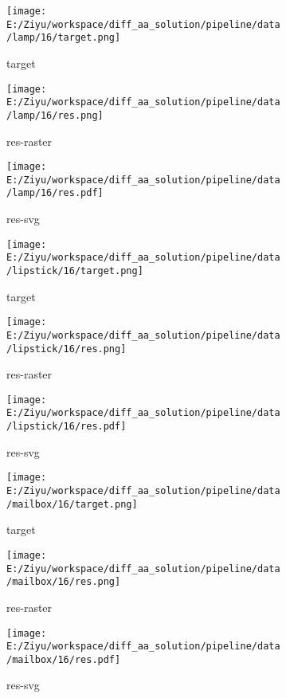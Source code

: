 \documentclass{article}%
\begin{document}
%


\begin{figure}[H]%
\begin{subfigure}[b]{0.32\linewidth}%
\texttt{[image: E:/Ziyu/workspace/diff\_aa\_solution/pipeline/data/lamp/16/target.png]}%
\caption{target}%
\end{subfigure}%
\begin{subfigure}[b]{0.32\linewidth}%
\texttt{[image: E:/Ziyu/workspace/diff\_aa\_solution/pipeline/data/lamp/16/res.png]}%
\caption{res{-}raster}%
\end{subfigure}%
\begin{subfigure}[b]{0.32\linewidth}%
\texttt{[image: E:/Ziyu/workspace/diff\_aa\_solution/pipeline/data/lamp/16/res.pdf]}%
\caption{res{-}svg}%
\end{subfigure}%
\par\vspace{1em}%
\caption{}%
\clearpage%
\end{figure}

%


\begin{figure}[H]%
\begin{subfigure}[b]{0.32\linewidth}%
\texttt{[image: E:/Ziyu/workspace/diff\_aa\_solution/pipeline/data/lipstick/16/target.png]}%
\caption{target}%
\end{subfigure}%
\begin{subfigure}[b]{0.32\linewidth}%
\texttt{[image: E:/Ziyu/workspace/diff\_aa\_solution/pipeline/data/lipstick/16/res.png]}%
\caption{res{-}raster}%
\end{subfigure}%
\begin{subfigure}[b]{0.32\linewidth}%
\texttt{[image: E:/Ziyu/workspace/diff\_aa\_solution/pipeline/data/lipstick/16/res.pdf]}%
\caption{res{-}svg}%
\end{subfigure}%
\par\vspace{1em}%
\caption{}%
\end{figure}

%


\begin{figure}[H]%
\begin{subfigure}[b]{0.32\linewidth}%
\texttt{[image: E:/Ziyu/workspace/diff\_aa\_solution/pipeline/data/mailbox/16/target.png]}%
\caption{target}%
\end{subfigure}%
\begin{subfigure}[b]{0.32\linewidth}%
\texttt{[image: E:/Ziyu/workspace/diff\_aa\_solution/pipeline/data/mailbox/16/res.png]}%
\caption{res{-}raster}%
\end{subfigure}%
\begin{subfigure}[b]{0.32\linewidth}%
\texttt{[image: E:/Ziyu/workspace/diff\_aa\_solution/pipeline/data/mailbox/16/res.pdf]}%
\caption{res{-}svg}%
\end{subfigure}%
\par\vspace{1em}%
\caption{}%
\end{figure}
\end{document}
